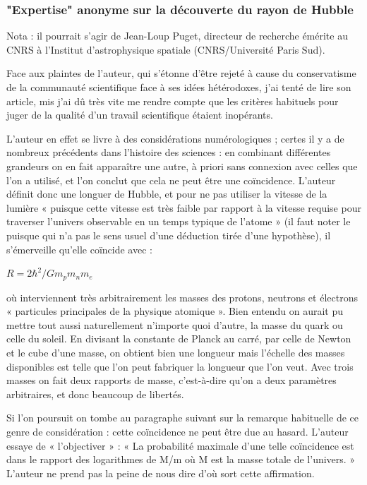 \documentclass[a4paper,12pt]{article}
\begin{document}
\subsubsection{"Expertise" anonyme sur la découverte du rayon de Hubble} 

Nota : il pourrait s'agir de Jean-Loup Puget, directeur de recherche émérite au CNRS à l'Institut d'astrophysique spatiale (CNRS/Université Paris Sud). %

Face aux plaintes de l’auteur, qui s'étonne d’être rejeté à cause du conservatisme de la communauté scientifique face à ses idées hétérodoxes, j’ai tenté de lire son article, mis j’ai dû très vite me rendre compte que les critères habituels pour juger de la qualité d’un travail scientifique étaient inopérants.

L’auteur en effet se livre à des considérations numérologiques ; certes il y a de nombreux précédents dans l’histoire des sciences : en combinant différentes grandeurs on en fait apparaître une autre, à priori sans connexion avec celles que l’on a utilisé, et l’on conclut que cela ne peut être une coïncidence. L’auteur définit donc une longuer de Hubble, et pour ne pas utiliser la vitesse de la lumière « puisque cette vitesse est très faible par rapport à la vitesse requise pour traverser l’univers observable en un temps typique de l’atome » (il faut noter le puisque qui n’a pas le sens usuel d’une déduction tirée d’une hypothèse), il s’émerveille qu’elle coïncide avec :

 $R = 2 \hbar^2/Gm_pm_nm_e$

où interviennent très arbitrairement les masses des protons, neutrons et électrons « particules principales de la physique atomique ». Bien entendu on aurait pu mettre tout aussi naturellement n’importe quoi d’autre, la masse du quark ou celle du soleil. En divisant la constante de Planck au carré, par celle de Newton et le cube d’une masse, on obtient bien une longueur mais l’échelle des masses disponibles est telle que l’on peut fabriquer la longueur que l’on veut. Avec trois masses on fait deux rapports de masse, c’est-à-dire qu’on a deux paramètres arbitraires, et donc beaucoup de libertés.

Si l’on poursuit on tombe au paragraphe suivant sur la remarque habituelle de ce genre de considération : cette coïncidence ne peut être due au hasard. L’auteur essaye de « l’objectiver » : « La probabilité maximale d’une telle coïncidence est dans  le rapport des logarithmes de M/m où M est la masse totale de l’univers. » L’auteur ne prend pas la peine de nous dire d’où sort cette affirmation.
\end{document}
